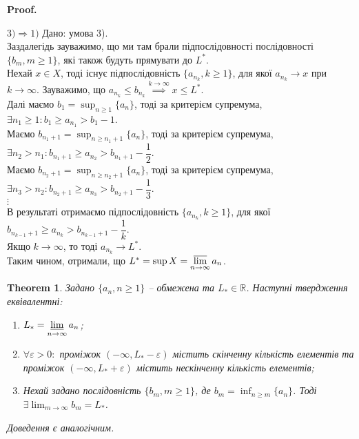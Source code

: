 \documentclass[a4paper, 14pt]{article}
\makeatletter
\def\qed{$\blacksquare$}
\theoremstyle{theoremdd}
\newtheorem{theorem}{Theorem}[subsection]
\theoremstyle{theoremdd}
\theoremstyle{theoremdd}
\theoremstyle{theoremdd}
\theoremstyle{theoremdd}
\theoremstyle{theoremdd}
\theoremstyle{theoremdd}
\theoremstyle{theoremdd}
\renewenvironment{proof}[1][Proof.\\]{\par
\pushQED{\hfill \qed}%
\normalfont \topsep6\p@\@plus6\p@\relax
\trivlist
\item\relax
{\bfseries
#1\@addpunct{.}}\hspace\labelsep\ignorespaces
}{%
\popQED\endtrivlist\@endpefalse
}
\makeatother
\begin{document}
\begin{proof}
	$\boxed{3) \Rightarrow 1)}$ Дано: умова 3).\\
	\iffalse %
	Ідея доведення: $L^* = \sup X$ означає, що:\\
	- яку б я підпослідовність з частковою границею я б не взяв, всі вони будуть не перевищувати числа $L^*$\\
	- знайдемо деяку підпослідовність, де члени будуть перебільшувати $L^*$, зменшений на деяке число\\
	\fi
	Заздалегідь зауважимо, що ми там брали підпослідовності послідовності $\{b_m, m \geq 1\}$, які також будуть прямувати до $L^*$.\\
	Нехай $x \in X$, тоді існує підпослідовність $\{a_{n_k}, k \geq 1\}$, для якої $a_{n_k} \to x$ при $k \to \infty$. Зауважимо, що $a_{n_k} \leq b_{{n_k}} \overset{k \to \infty}{\implies} x \leq L^*$.\\
	Далі маємо $b_1 = \displaystyle\sup_{n \geq 1} \{a_n\}$, тоді за критерієм супремума, $\exists n_1 \geq 1: b_1 \geq a_{n_1} > b_1-1$.\\
	Маємо $b_{n_1+1} = \displaystyle\sup_{n \geq n_1+1} \{a_n\}$, тоді за критерієм супремума, $\exists n_2 > n_1: b_{n_1+1} \geq a_{n_2} > b_{n_1+1} - \dfrac{1}{2}$.\\
	Маємо $b_{n_2+1} = \displaystyle\sup_{n \geq n_2+1} \{a_n\}$, тоді за критерієм супремума, $\exists n_3 > n_2: b_{n_2+1} \geq a_{n_3} > b_{n_2+1} - \dfrac{1}{3}$.\\
	$\vdots$\\
	В результаті отримаємо підпослідовність $\{a_{n_k}, k \geq 1\}$, для якої $b_{n_{k-1}+1} \geq a_{n_k} > b_{n_{k-1}+1} - \dfrac{1}{k}$.\\
	Якщо $k \to \infty$, то тоді $a_{n_k} \to L^*$.\\
	Таким чином, отримали, що $L^* = \sup X = \displaystyle\varlimsup_{n \to \infty} a_n$.
	\end{proof}
	
	\begin{theorem}
	Задано $\{a_n, n \geq 1\}$ -- обмежена та $L_* \in \mathbb{R}$. Наступні твердження еквівалентні:\\
	\begin{enumerate}[nosep,wide=0pt,label={\arabic*)}]
	\item $L_* = \displaystyle \varliminf_{n \to \infty} a_n$;
	\item $\forall \varepsilon > 0:$ проміжок $(-\infty,  L_*-\varepsilon)$ містить скінченну кількість елементів та проміжок $(-\infty,  L_*+\varepsilon)$ містить нескінченну кількість елементів;
	\item Нехай задано послідовність $\{b_m, m \geq 1\}$, де $b_m = \displaystyle \inf_{n \geq m} \{a_n\}$. Тоді $\exists \displaystyle \lim_{m \to \infty} b_m = L_*$.
	\end{enumerate}
	\textit{Доведення є аналогічним.}
	\end{theorem}
	
\end{document}
